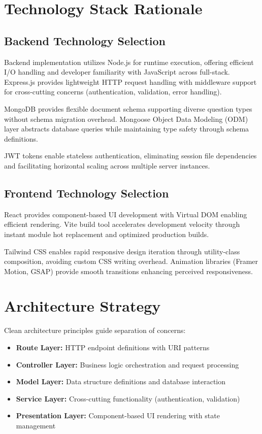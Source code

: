 \documentclass[12pt,a4paper]{report}
\begin{document}
\section{Technology Stack Rationale}

\subsection{Backend Technology Selection}

Backend implementation utilizes Node.js for runtime execution, offering efficient I/O handling and developer familiarity with JavaScript across full-stack. Express.js provides lightweight HTTP request handling with middleware support for cross-cutting concerns (authentication, validation, error handling).

MongoDB provides flexible document schema supporting diverse question types without schema migration overhead. Mongoose Object Data Modeling (ODM) layer abstracts database queries while maintaining type safety through schema definitions.

JWT tokens enable stateless authentication, eliminating session file dependencies and facilitating horizontal scaling across multiple server instances.

\subsection{Frontend Technology Selection}

React provides component-based UI development with Virtual DOM enabling efficient rendering. Vite build tool accelerates development velocity through instant module hot replacement and optimized production builds.

Tailwind CSS enables rapid responsive design iteration through utility-class composition, avoiding custom CSS writing overhead. Animation libraries (Framer Motion, GSAP) provide smooth transitions enhancing perceived responsiveness.

\section{Architecture Strategy}

Clean architecture principles guide separation of concerns:

\begin{itemize}[left=0pt]
  \item \textbf{Route Layer:} HTTP endpoint definitions with URI patterns
  \item \textbf{Controller Layer:} Business logic orchestration and request processing
  \item \textbf{Model Layer:} Data structure definitions and database interaction
  \item \textbf{Service Layer:} Cross-cutting functionality (authentication, validation)
  \item \textbf{Presentation Layer:} Component-based UI rendering with state management
\end{itemize}
\end{document}
